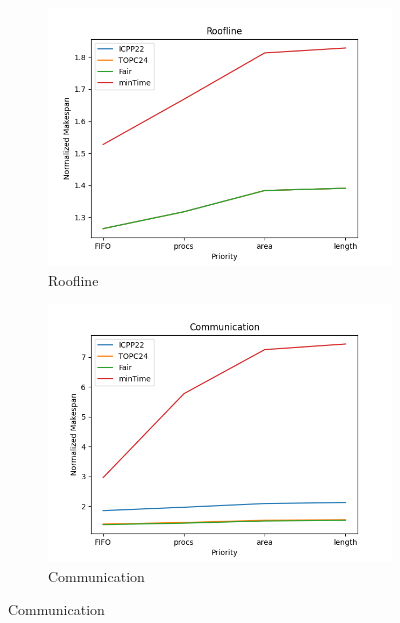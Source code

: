 \documentclass{article}
\begin{document}
\begin{figure}[htbp]
\centering
\begin{subfigure}[b]{0.32\textwidth}\includegraphics[width=\textwidth]{Results/Priority/Priority_Roofline}\caption{Roofline}\label{fig:lines_figures_Priority_Roofline}\end{subfigure}
\hfill
\begin{subfigure}[b]{0.32\textwidth}\includegraphics[width=\textwidth]{Results/Priority/Priority_Communication}\caption{Communication}\label{fig:lines_figures_Priority_Communication}\end{subfigure}
\hfill

\end{figure}
\end{document}
